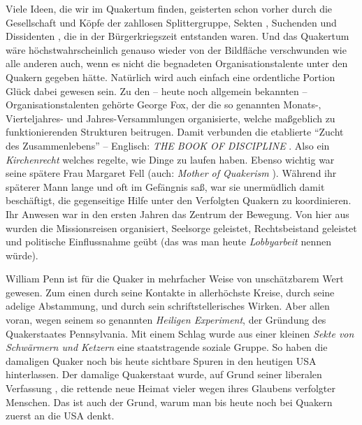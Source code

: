 \medskip

Viele Ideen, die wir im Quakertum finden, geisterten schon vorher durch die
Gesellschaft und Köpfe der zahllosen Splittergruppe, Sekten
, Suchenden und
Dissidenten , die in der Bürgerkriegszeit
 entstanden waren. Und das Quakertum
wäre höchstwahrscheinlich genauso wieder von der Bildfläche verschwunden wie
alle anderen auch, wenn es nicht die begnadeten Organisationstalente unter den
Quakern gegeben hätte. Natürlich wird auch einfach eine ordentliche Portion
Glück
dabei gewesen sein. Zu den -- heute noch allgemein bekannten --
Organisationstalenten gehörte George Fox, der die so genannten Monats-,
Vierteljahres-
und Jahres-Versammlungen  
 organisierte, welche maßgeblich zu
funktionierenden
Strukturen beitrugen. Damit verbunden die etablierte "`Zucht des
Zusammenlebens"' 
--
Englisch: \textit{THE BOOK OF DISCIPLINE}  . Also ein
\textit{Kirchenrecht}  welches
regelte, wie Dinge zu laufen haben. Ebenso wichtig war seine spätere Frau
Margaret Fell  (auch: \textit{Mother of
Quakerism} ). Während ihr späterer Mann
lange und oft im Gefängnis saß, war sie unermüdlich damit beschäftigt, die
gegenseitige Hilfe unter den Verfolgten  Quakern zu
koordinieren. Ihr Anwesen
war in den ersten Jahren das Zentrum der Bewegung. Von hier aus wurden die
Missionsreisen organisiert, Seelsorge  geleistet,
Rechtsbeistand geleistet und
politische Einflussnahme  geübt (das was man heute
\textit{Lobbyarbeit}  nennen
würde).

\medskip

William Penn ist für die Quaker in mehrfacher Weise von unschätzbarem Wert
gewesen.
Zum einen durch seine Kontakte in allerhöchste Kreise, durch seine adelige
Abstammung,
und
durch sein schriftstellerisches Wirken. Aber allen voran, wegen seinem so
genannten \textit{Heiligen Experiment}, der
Gründung des Quakerstaates  
Pennsylvania. Mit einem Schlag wurde aus einer kleinen \textit{Sekte von
Schwärmern und Ketzern} eine staatstragende soziale Gruppe. So haben die
damaligen Quaker noch bis heute sichtbare Spuren in den heutigen USA
hinterlassen.
Der damalige Quakerstaat wurde, auf Grund seiner liberalen Verfassung
, die
rettende neue Heimat vieler wegen ihres Glaubens verfolgter Menschen. Das ist
auch der Grund, warum man bis heute noch bei Quakern zuerst an die USA denkt.

